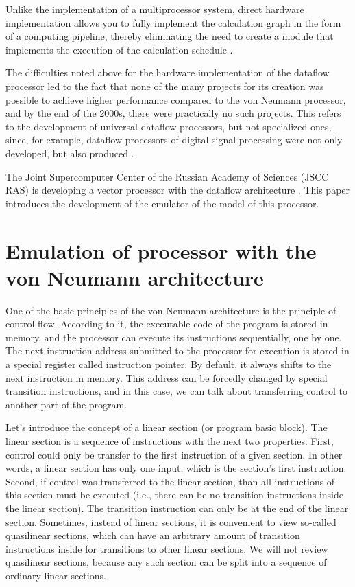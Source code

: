 \documentclass[
11pt,%
tightenlines,%
twoside,%
onecolumn,%
nofloats,%
nobibnotes,%
nofootinbib,%
superscriptaddress,%
noshowpacs,%
centertags]%
{revtex4}
\begin{document}
Unlike the implementation of a multiprocessor system, direct hardware implementation allows you to fully implement the calculation graph in the form of a computing pipeline, thereby eliminating the need to create a module that implements the execution of the calculation schedule \cite{popov}.

The difficulties noted above for the hardware implementation of the dataflow processor led to the fact that none of the many projects for its creation was possible to achieve higher performance compared to the von Neumann processor, and by the end of the 2000s, there were practically no such projects.
This refers to the development of universal dataflow processors, but not specialized ones, since, for example, dataflow processors of digital signal processing were not only developed, but also produced \cite{terada}.

The Joint Supercomputer Center of the Russian Academy of Sciences (JSCC RAS) is developing a vector processor with the dataflow architecture \cite{vpp}. This paper introduces the development of the emulator of the model of this processor. 


\section{Emulation of processor with the von Neumann architecture}

One of the basic principles of the von Neumann architecture is the principle of control flow.
According to it, the executable code of the program is stored in memory, and the processor can execute its instructions sequentially, one by one.
The next instruction address submitted to the processor for execution is stored in a special register called instruction pointer.
By default, it always shifts to the next instruction in memory.
This address can be forcedly changed by special transition instructions, and in this case, we can talk about transferring control to another part of the program.

Let's introduce the concept of a linear section (or program basic block).
The linear section is a sequence of instructions with the next two properties.
First, control could only be transfer to the first instruction of a given section.
In other words, a linear section has only one input, which is the section's first  instruction.
Second, if control was transferred to the linear section, than all instructions of this section must be executed (i.e., there can be no transition instructions inside the linear section).
The transition instruction can only be at the end of the linear section.
Sometimes, instead of linear sections, it is convenient to view so-called quasilinear sections, which can have an arbitrary amount of transition instructions inside for transitions to other linear sections.
We will not review quasilinear sections, because any such section can be split into a sequence of ordinary linear sections.
\end{document}
